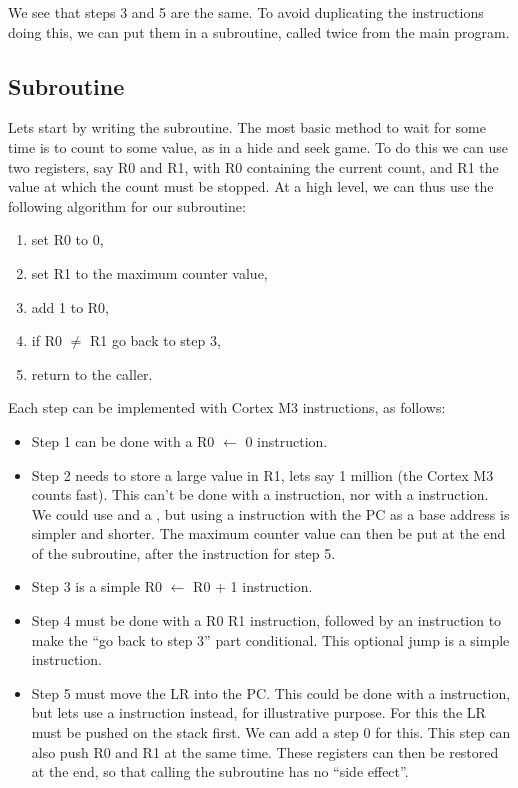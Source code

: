 We see that steps 3 and 5 are the same. To avoid duplicating the instructions
doing this, we can put them in a subroutine, called twice from the main program.

\subsection{Subroutine}

Lets start by writing the subroutine. The most basic method to wait for some
time is to count to some value, as in a hide and seek game. To do this we can
use two registers, say R0 and R1, with R0 containing the current count, and R1
the value at which the count must be stopped. At a high level, we can thus
use the following algorithm for our subroutine:
\begin{enumerate}
  \item set R0 to 0,
  \item set R1 to the maximum counter value,
  \item add 1 to R0,
  \item if R0 $\ne$ R1 go back to step 3,
  \item return to the caller.
\end{enumerate}

Each step can be implemented with Cortex M3 instructions, as follows:
\begin{itemize}
  \item Step 1 can be done with a  R0 $\leftarrow$ 0 instruction.

  \item Step 2 needs to store a large value in R1, lets say 1 million (the
  Cortex M3 counts fast). This can't be done with a  instruction, nor
  with a  instruction. We could use  and a , but
  using a  instruction with the PC as a base address is simpler and
  shorter. The maximum counter value can then be put at the end of the
  subroutine, after the instruction for step 5.

  \item Step 3 is a simple  R0 $\leftarrow$ R0 + 1 instruction.

  \item Step 4 must be done with a  R0 R1 instruction, followed by an
   instruction to make the ``go back to step 3'' part conditional. This
  optional jump is a simple  instruction.

  \item Step 5 must move the LR into the PC. This could be done with a
   instruction, but lets use a  instruction instead, for
  illustrative purpose. For this the LR must be pushed on the stack first. We
  can add a step 0 for this. This step can also push R0 and R1 at the same
  time. These registers can then be restored at the end, so that calling the
  subroutine has no ``side effect''.
\end{itemize}


